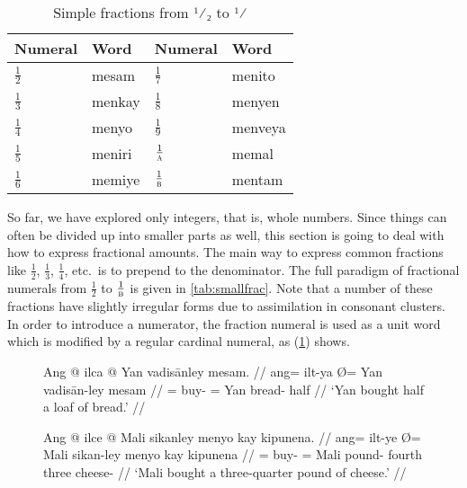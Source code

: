 \begin{table}[p]\centering
\caption[Simple fractions from $\frac{1}{2}$ to $\frac{1}{\elv}$]{Simple 
fractions from ¹⁄₂ to ¹⁄\tsub{\elv}}
\begin{tabu} to .75\linewidth {X I X I}
\toprule\tableheaderfont
Numeral
	& Word
	& Numeral
	& Word
	\\
\toprule

$\frac{1}{2}$
	& mesam %
	& $\frac{1}{7}$
	& menito %
	\\ [.25\baselineskip]

$\frac{1}{3}$
	& menkay %
	& $\frac{1}{8}$
	& menyen %
	\\ [.25\baselineskip]

$\frac{1}{4}$
	& menyo %
	& $\frac{1}{9}$
	& menveya %
	\\ [.25\baselineskip]

$\frac{1}{5}$
	& meniri %
	& $\frac{1}{\textsc{a}}$
	& memal %
	\\ [.25\baselineskip]

$\frac{1}{6}$
	& memiye %
	& $\frac{1}{\elv}$
	& mentam %
	\\

\bottomrule
\end{tabu}
\label{tab:smallfrac}
\end{table}

So far, we have explored only integers, that is, whole numbers. Since things
can often be divided up into smaller parts as well, this section is going to
deal with how to express fractional amounts. The main way to express common
fractions like $\frac{1}{2}$, $\frac{1}{3}$, $\frac{1}{4}$, etc.\ is to prepend
 to the denominator. The full paradigm of fractional
numerals from $\frac{1}{2}$ to $\frac{1}{\elv}$ is given in
\autoref{tab:smallfrac}. Note that a number of these fractions have slightly
irregular forms due to assimilation in consonant clusters. In order to
introduce a numerator, the fraction numeral is used as a unit word which is
modified by a regular cardinal numeral, as (\ref{ex:simplefrac}) shows.

\begin{figure}[h]
\pex\label{ex:simplefrac}
\a\begingl
	\gla Ang @ ilca {} @ Yan vadisānley mesam. //
	\glb ang= ilt-ya Ø= Yan vadisān-ley mesam //
	\glc \AgtT{}= buy-\TsgM{} \Top{}= Yan bread-\PargI{} half //
	\glft `Yan bought half a loaf of bread.' //
\endgl

\a\begingl
	\gla Ang @ ilce {} @ Mali sikanley menyo kay kipunena. //
	\glb ang= ilt-ye Ø= Mali sikan-ley menyo kay kipunena //
	\glc \AgtT{}= buy-\TsgM{} \Top{}= Mali pound-\PargI{} fourth three
		cheese-\Gen{} //
	\glft `Mali bought a three-quarter pound of cheese.' //
\endgl
\xe
\end{figure}

